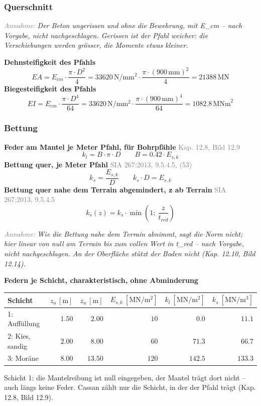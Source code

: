 \documentclass[11pt,a4paper]{article}
\newcommand{\normref}[1]{{\small\textcolor{gray}{#1}}}
\newcommand{\hinweis}[2]{\par\noindent\textcolor{gray}{\textit{#1:}} \textit{#2}\par}
\begin{document}
\subsubsection{Querschnitt}
\hinweis{Annahme}{Der Beton ungerissen und ohne die Bewehrung, mit E\_cm – nach Vorgabe, nicht nachgeschlagen. Gerissen ist der Pfahl weicher: die Verschiebungen werden grösser, die Momente etwas kleiner.}
\noindent\textbf{Dehnsteifigkeit des Pfahls}
\begin{equation*}
EA = E_{cm} \cdot \frac{\pi \cdot D^{2}}{4} = 33620\,\mathrm{N}/\mathrm{mm}^{2} \cdot \frac{\pi \cdot \left(900\,\mathrm{mm}\right)^{2}}{4} = 21388\,\mathrm{MN}
\end{equation*}
\noindent\textbf{Biegesteifigkeit des Pfahls}
\begin{equation*}
EI = E_{cm} \cdot \frac{\pi \cdot D^{4}}{64} = 33620\,\mathrm{N}/\mathrm{mm}^{2} \cdot \frac{\pi \cdot \left(900\,\mathrm{mm}\right)^{4}}{64} = 1082.8\,\mathrm{MNm}^{2}
\end{equation*}
\subsubsection{Bettung}
\noindent\textbf{Feder am Mantel je Meter Pfahl, für Bohrpfähle} \hfill \normref{Kap. 12.8, Bild 12.9}
\begin{equation*}
k_l = B \cdot \pi \cdot D \qquad B = 0.42 \cdot E_{s,k}
\end{equation*}
\noindent\textbf{Bettung quer, je Meter Pfahl} \hfill \normref{SIA 267:2013, 9.5.4.5, (53)}
\begin{equation*}
k_s = \frac{E_{s,k}}{D} \qquad k_s \cdot D = E_{s,k}
\end{equation*}
\noindent\textbf{Bettung quer nahe dem Terrain abgemindert, z ab Terrain} \hfill \normref{SIA 267:2013, 9.5.4.5}
\begin{equation*}
k_s(z) = k_s \cdot \min\left(1;\ \frac{z}{t_{red}}\right)
\end{equation*}
\hinweis{Annahme}{Wie die Bettung nahe dem Terrain abnimmt, sagt die Norm nicht; hier linear von null am Terrain bis zum vollen Wert in t\_red – nach Vorgabe, nicht nachgeschlagen. An der Oberfläche stützt der Boden nicht (Kap. 12.10, Bild 12.14).}
\noindent\textbf{Federn je Schicht, charakteristisch, ohne Abminderung}
\begin{longtable}{lrrrrr}
\hline
Schicht & $z_o\ [\mathrm{m}]$ & $z_u\ [\mathrm{m}]$ & $E_{s,k}\ [\mathrm{MN/m^2}]$ & $k_l\ [\mathrm{MN/m^2}]$ & $k_s\ [\mathrm{MN/m^3}]$ \\
\hline
\endhead
1: Auffüllung & $1.50$ & $2.00$ & $10$ & $0.0$ & $11.1$ \\
2: Kies, sandig & $2.00$ & $8.00$ & $60$ & $71.3$ & $66.7$ \\
3: Moräne & $8.00$ & $13.50$ & $120$ & $142.5$ & $133.3$ \\
\hline
\end{longtable}
Schicht 1: die Mantelreibung ist null eingegeben, der Mantel trägt dort nicht – auch längs keine Feder. Cassan zählt nur die Schicht, in der der Pfahl trägt (Kap. 12.8, Bild 12.9).
\end{document}
